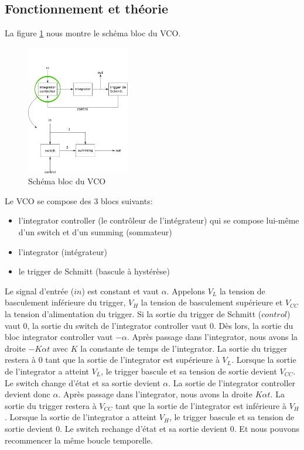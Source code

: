 
\subsection{Fonctionnement et théorie}
La figure \ref{fig:schema_bloc_vco} nous montre le schéma bloc du VCO.
\begin{figure}[ht]
	\centering
	\includegraphics[width=0.4\textwidth]{img/schema_bloc_vco.png}
	\caption{Schéma bloc du VCO}
	\label{fig:schema_bloc_vco}
\end{figure}
Le VCO se compose des 3 blocs suivants:
\begin{itemize}
\item l'integrator controller (le contrôleur de l'intégrateur) qui se compose lui-même d'un switch et d'un summing (sommateur)
\item l'integrator (intégrateur)
\item le trigger de Schmitt (bascule à hystérèse)
\end{itemize}

Le signal d'entrée ($in$) est constant et vaut $\alpha$. Appelons $V_L$ la tension de basculement inférieure du trigger, $V_H$ la tension de basculement supérieure et $V_{CC}$ la tension d'alimentation du trigger.
Si la sortie du trigger de Schmitt ($control$) vaut $0$, la sortie du switch de l'integrator controller vaut $0$. Dès lors, la sortie du bloc integrator controller vaut $-\alpha$.  Après passage dans l'integrator, nous avons la droite $-K\alpha t$ avec $K$ la constante de temps de l'integrator. La sortie du trigger restera à $0$ tant que la sortie de l'integrator est supérieure à $V_L$. Lorsque la sortie de l'integrator a atteint $V_L$, le trigger bascule et sa tension de sortie devient $V_{CC}$. Le switch change d'état et sa sortie devient $\alpha$. La sortie de l'integrator controller devient donc $\alpha$. Après passage dans l'integrator, nous avons la droite $K\alpha t$. La sortie du trigger restera à $V_{CC}$ tant que la sortie de l'integrator est inférieure à $V_H$. Lorsque la sortie de l'integrator a atteint $V_H$, le trigger bascule et sa tension de sortie devient $0$. Le switch rechange d'état et sa sortie devient $0$. Et nous pouvons recommencer la même boucle temporelle.

